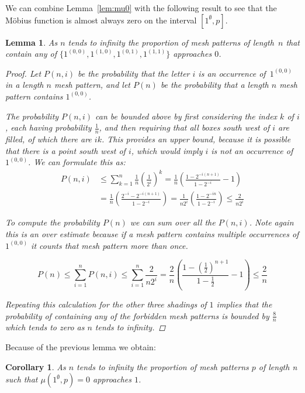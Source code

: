 \documentclass[preprint,11pt]{elsarticle}
\newtheorem{lem}[thm]{Lemma}\crefname{lem}{Lemma}{Lemmas}
\newtheorem{cor}[thm]{Corollary}\crefname{cor}{Corollary}{Corollaries}
\numberwithin{equation}{section}
\numberwithin{figure}{section}
\numberwithin{thm}{section}
\begin{document}
We can combine Lemma~\ref{lem:mu0} with the following result to see that the
M\"obius function is almost always zero on the interval $[1^\emptyset,p]$.

\begin{lem}
As $n$ tends to infinity the proportion of mesh patterns of length~$n$ that contain any of
$\{1^{(0,0)},1^{(1,0)},1^{(0,1)},1^{(1,1)}\}$ approaches $0$.
\begin{proof}
Let $P(n,i)$ be the probability that the letter $i$ is an occurrence of~$1^{(0,0)}$
in a length $n$ mesh pattern, and let $P(n)$ be the probability
that a length $n$ mesh pattern contains $1^{(0,0)}$.

The probability $P(n,i)$ can be bounded
above by first considering the index $k$ of $i$, each having probability
$\frac{1}{n}$, and then requiring
that all boxes south west of $i$ are filled, of which there are $ik$. This
provides an upper bound, because it is possible that there is a
point south west of $i$, which would imply $i$ is not an occurrence of
$1^{(0,0)}$. We can formulate this as:
\begin{align*}
P(n,i)&\le\sum_{k=1}^{n}\frac{1}{n}\left(\frac{1}{2^i}\right)^k
=\frac{1}{n}\left(\frac{1-2^{-i(n+1)}}{1-2^{-i}}-1\right)\\
&=\frac{1}{n}\left(\frac{2^{-i}-2^{-i(n+1)}}{1-2^{-i}}\right)
=\frac{1}{n2^i}\left(\frac{1-2^{-in}}{1-2^{-i}}\right)
\le\frac{2}{n2^i}
\end{align*}

To compute the probability $P(n)$ we
can sum over all the $P(n,i)$.
Note again this is an over estimate because if a mesh pattern contains multiple
occurrences of $1^{(0,0)}$ it counts that mesh pattern more than once.

$$
P(n)\le\sum_{i=1}^{n}P(n,i)\le\sum_{i=1}^{n}\frac{2}{n2^i}
=\frac{2}{n}\left(\frac{1-\left(\frac{1}{2}\right)^{n+1}}{1-\frac{1}{2}}-1\right)
\le\frac{2}{n}
$$

Repeating this calculation for the other three shadings of $1$ implies that
the probability of containing any of the forbidden mesh patterns is bounded
by $\frac{8}{n}$ which tends to zero as $n$ tends to infinity.
\end{proof}
\end{lem}

Because of the previous lemma we obtain:

\begin{cor}
As $n$ tends to infinity the proportion of mesh patterns $p$ of length n such
that $\mu(1^\emptyset,p)=0$ approaches $1$.
\end{cor}
\end{document}
